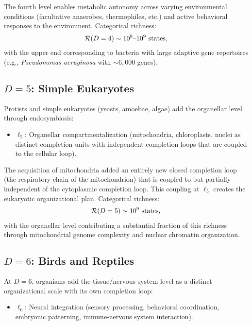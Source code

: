 The fourth level enables metabolic autonomy across varying environmental
conditions (facultative anaerobes, thermophiles, etc.) and active behavioral
responses to the environment. Categorical richness:
\begin{equation}
  \mathcal{R}(D=4) \sim 10^8\text{--}10^9 \text{ states},
  \label{eq:richness_D4}
\end{equation}
with the upper end corresponding to bacteria with large adaptive gene
repertoires (e.g., \textit{Pseudomonas aeruginosa} with $\sim 6,000$ genes).

\subsection{$D = 5$: Simple Eukaryotes}

Protists and simple eukaryotes (yeasts, amoebae, algae) add the organellar
level through endosymbiosis:
\begin{itemize}
  \item $\ell_5$: Organellar compartmentalization (mitochondria, chloroplasts,
        nuclei as distinct completion units with independent completion loops
        that are coupled to the cellular loop).
\end{itemize}

The acquisition of mitochondria added an entirely new closed completion loop
(the respiratory chain of the mitochondrion) that is coupled to but partially
independent of the cytoplasmic completion loop. This coupling at $\ell_5$
creates the eukaryotic organizational plan. Categorical richness:
\begin{equation}
  \mathcal{R}(D=5) \sim 10^9 \text{ states},
  \label{eq:richness_D5}
\end{equation}
with the organellar level contributing a substantial fraction of this richness
through mitochondrial genome complexity and nuclear chromatin organization.

\subsection{$D = 6$: Birds and Reptiles}

At $D = 6$, organisms add the tissue/nervous system level as a distinct
organizational scale with its own completion loop:
\begin{itemize}
  \item $\ell_6$: Neural integration (sensory processing, behavioral
        coordination, embryonic patterning, immune-nervous system interaction).
\end{itemize}

